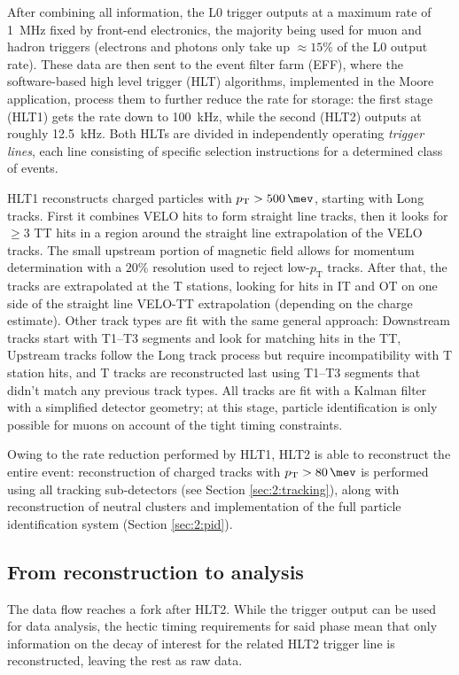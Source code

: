 After combining all information, the L0 trigger outputs at a maximum rate of \SI{1}{\mega\hertz} fixed by front-end electronics, the majority being used for muon and hadron triggers (electrons and photons only take up $\approx 15\%$ of the L0 output rate).
These data are then sent to the event filter farm (EFF), where the software-based high level trigger (HLT) algorithms, implemented in the Moore application, process them to further reduce the rate for storage:
the first stage (HLT1) gets the rate down to \SI{100}{\kilo\hertz}, while the second (HLT2) outputs at roughly \SI{12.5}{\kilo\hertz}.
Both HLTs are divided in independently operating \textit{trigger lines}, each line consisting of specific selection instructions for a determined class of events.

HLT1 reconstructs charged particles with $p_\text{T} > \SI{500}{\mev}$, starting with Long tracks.
First it combines VELO hits to form straight line tracks, then it looks for $\geq 3$ TT hits in a region around the straight line extrapolation of the VELO tracks. The small upstream portion of magnetic field allows for momentum determination with a $20\%$ resolution used to reject low-$p_\text{T}$ tracks.
After that, the tracks are extrapolated at the T stations, looking for hits in IT and OT on one side of the straight line VELO-TT extrapolation (depending on the charge estimate).
Other track types are fit with the same general approach:
Downstream tracks start with T1--T3 segments and look for matching hits in the TT, Upstream tracks follow the Long track process but require incompatibility with T station hits, and T tracks are reconstructed last using T1--T3 segments that didn't match any previous track types.
All tracks are fit with a Kalman filter with a simplified detector geometry;
at this stage, particle identification is only possible for muons on account of the tight timing constraints.

Owing to the rate reduction performed by HLT1, HLT2 is able to reconstruct the entire event:
reconstruction of charged tracks with $p_\text{T} > \SI{80}{\mev}$ is performed using all tracking sub-detectors (see Section \ref{sec:2:tracking}), along with reconstruction of neutral clusters and implementation of the full particle identification system (Section \ref{sec:2:pid}).

\subsection{From reconstruction to analysis}
The data flow reaches a fork after HLT2.
While the trigger output can be used for data analysis, the hectic timing requirements for said phase mean that only information on the decay of interest for the related HLT2 trigger line is reconstructed, leaving the rest as raw data.

